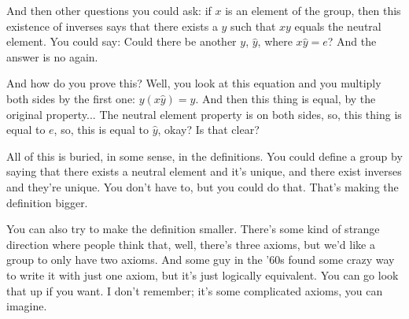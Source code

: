 \begin{speech}[00:03:20 - 00:05:05]
And then other questions you could ask:  if $x$ is an element of the group, then this existence of inverses says that there exists a $y$ such that $xy$ equals the neutral element. You could say: Could there be another $y$, $\hat{y}$, where $x\hat{y} = e$?  And the answer is no again. 

And how do you prove this? Well, you look at this equation and you multiply both sides by the first one: $y(x\hat{y}) = y$. And then this thing is equal, by the original property... The neutral element property is on both sides, so, this thing is equal to $e$, so, this is equal to $\hat{y}$,  okay? Is that clear?

All of this is buried, in some sense, in the definitions. You could define a group by saying that there exists a neutral element and it's unique, and there exist inverses and they're unique. You don't have to, but you could do that. That's making the definition bigger.

You can also try to make the definition smaller. There's some kind of strange direction where people think that, well, there's three axioms, but we'd like a group to only have two axioms. And some guy in the '60s found some crazy way to write it with just one axiom, but it's just logically equivalent. You can go look that up if you want. I don't remember; it's some complicated axioms, you can imagine.
\end{speech}

